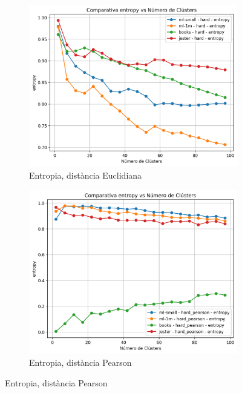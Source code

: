 \documentclass[a4paper,12pt]{report}
\begin{document}
\begin{figure}[H]
    \vspace{1em}

    \begin{subfigure}[b]{0.49\textwidth}
        \includegraphics[width=\textwidth]{Figuras/entropy-hard-all.png}
        \caption{Entropia, distància Euclidiana}
        \label{fig:hard-clustering-results-e}
    \end{subfigure}
    \hfill
    \begin{subfigure}[b]{0.49\textwidth}
        \includegraphics[width=\textwidth]{Figuras/entropy-hard_pearson-all.png}
        \caption{Entropia, distància Pearson}
        \label{fig:hard-clustering-results-f}
    \end{subfigure}


\end{figure}
\end{document}
